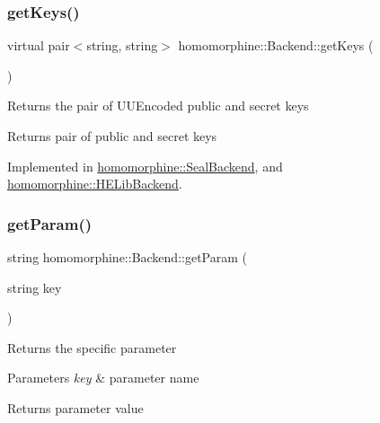 \subsubsection{\texorpdfstring{getKeys()}{getKeys()}}
{\footnotesize\ttfamily virtual pair$<$string, string$>$ homomorphine\+::\+Backend\+::get\+Keys (\begin{DoxyParamCaption}{ }\end{DoxyParamCaption})\hspace{0.3cm}{\ttfamily [pure virtual]}}

Returns the pair of U\+U\+Encoded public and secret keys

\begin{DoxyReturn}{Returns}
pair of public and secret keys 
\end{DoxyReturn}


Implemented in \mbox{\hyperlink{classhomomorphine_1_1_seal_backend_a30358e6405e2d1470468cf55aefb3f4d}{homomorphine\+::\+Seal\+Backend}}, and \mbox{\hyperlink{classhomomorphine_1_1_h_e_lib_backend_ab45838cc01a4e71425e2aa0279e12c0e}{homomorphine\+::\+H\+E\+Lib\+Backend}}.

\mbox{\label{classhomomorphine_1_1_backend_a34191d0dbdd9e300a88242156f90eb9b}} 
\subsubsection{\texorpdfstring{getParam()}{getParam()}}
{\footnotesize\ttfamily string homomorphine\+::\+Backend\+::get\+Param (\begin{DoxyParamCaption}\item[{string}]{key }\end{DoxyParamCaption})}

Returns the specific parameter


\begin{DoxyParams}{Parameters}
{\em key} & parameter name \\
\hline
\end{DoxyParams}
\begin{DoxyReturn}{Returns}
parameter value 
\end{DoxyReturn}
\mbox{\label{classhomomorphine_1_1_backend_a107e05b3bd55271356a57fbc0c1df091}} 
